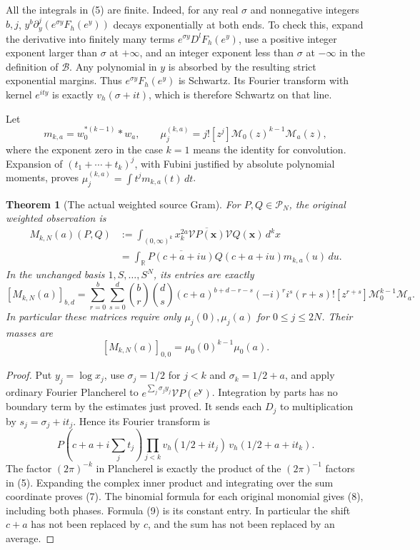 \documentclass[11pt]{article}
\newtheorem{theorem}{Theorem}
\newcommand{\B}{\mathscr B}
\newcommand{\V}{\mathcal V}
\begin{document}
All the integrals in (5) are finite. Indeed, for any real \(\sigma\)
and nonnegative integers \(b,j\),
\(y^b\partial_y^j(e^{\sigma y}F_h(e^y))\) decays exponentially at
both ends. To check this, expand the derivative into finitely many
terms \(e^{\sigma y}D^lF_h(e^y)\), use a positive integer exponent
larger than \(\sigma\) at \(+\infty\), and an integer exponent less
than \(\sigma\) at \(-\infty\) in the definition of \(\B\).
Any polynomial in \(y\) is absorbed by the resulting strict
exponential margins. Thus \(e^{\sigma y}F_h(e^y)\) is Schwartz.
Its Fourier transform with kernel \(e^{ity}\) is exactly
\(v_h(\sigma+it)\), which is therefore Schwartz on that line.

Let
\[
 m_{k,a}=w_0^{*(k-1)}*w_a,\qquad
 \mu^{(k,a)}_j=j![z^j]\mathcal M_0(z)^{k-1}\mathcal M_a(z),
 \tag{6}
\]
where the exponent zero in the case \(k=1\) means the identity for
convolution. Expansion of \((t_1+\cdots+t_k)^j\), with Fubini
justified by absolute polynomial moments, proves
\(\mu^{(k,a)}_j=\int t^jm_{k,a}(t)\,dt\).

\begin{theorem}[The actual weighted source Gram]
For \(P,Q\in\mathcal P_N\), the original weighted observation is
\[
 \begin{split}
 M_{k,N}(a)(P,Q)
 &:=\int_{(0,\infty)^k}x_k^{2a}
                 \overline{\V P(\mathbf x)}\V Q(\mathbf x)\,d^kx\\
 &=\int_{\mathbb R}\overline{P(c+a+iu)}Q(c+a+iu)
                 m_{k,a}(u)\,du.
 \end{split}
 \tag{7}
\]
In the unchanged basis \(1,S,\ldots,S^N\), its entries are exactly
\[
 [M_{k,N}(a)]_{b,d}
 =\sum_{r=0}^b\sum_{s=0}^d
 \binom br\binom ds(c+a)^{b+d-r-s}(-i)^ri^s
 (r+s)![z^{r+s}]\mathcal M_0^{k-1}\mathcal M_a.
 \tag{8}
\]
In particular these matrices require only \(\mu_j(0),\mu_j(a)\)
for \(0\le j\le2N\). Their masses are
\[
 [M_{k,N}(a)]_{0,0}=\mu_0(0)^{k-1}\mu_0(a).
 \tag{9}
\]
\end{theorem}
\begin{proof}
Put \(y_j=\log x_j\), use \(\sigma_j=1/2\) for \(j<k\) and
\(\sigma_k=1/2+a\), and apply ordinary Fourier Plancherel to
\(e^{\sum_j\sigma_jy_j}\V P(e^{\mathbf y})\). Integration by
parts has no boundary term by the estimates just proved. It sends each
\(D_j\) to multiplication by \(s_j=\sigma_j+it_j\). Hence its
Fourier transform is
\[
 P(c+a+i\textstyle\sum_jt_j)
 \prod_{j<k}v_h(1/2+it_j)\,v_h(1/2+a+it_k).
\]
The factor \((2\pi)^{-k}\) in Plancherel is exactly the product of
the \((2\pi)^{-1}\) factors in (5). Expanding the complex inner
product and integrating over the sum coordinate proves (7). The
binomial formula for each original monomial gives (8), including both
phases. Formula (9) is its constant entry. In particular the shift
\(c+a\) has not been replaced by \(c\), and the sum has not been
replaced by an average.
\end{proof}
\end{document}
